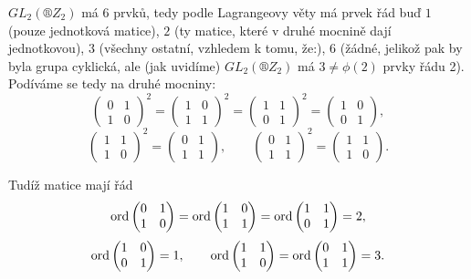 \documentclass[12pt]{article}                   %
\begin{document}
\begin{priklad}[5.2]
\begin{reseni}
            $GL_2(®Z_2)$ má 6 prvků, tedy podle Lagrangeovy věty má prvek řád buď $1$ (pouze jednotková matice), $2$ (ty matice, které v druhé mocnině dají jednotkovou), $3$ (všechny ostatní, vzhledem k tomu, že:), $6$ (žádné, jelikož pak by byla grupa cyklická, ale (jak uvidíme) $GL_2(®Z_2)$ má $3≠\phi(2)$ prvky řádu 2). Podíváme se tedy na druhé mocniny:
            $$  \begin{pmatrix} 0 & 1 \\ 1 & 0 \end{pmatrix}^2 = \begin{pmatrix} 1 & 0 \\ 1 & 1 \end{pmatrix}^2 = \begin{pmatrix} 1 & 1 \\ 0 & 1 \end{pmatrix}^2 = \begin{pmatrix} 1 & 0 \\ 0 & 1 \end{pmatrix}, $$
            $$ \begin{pmatrix} 1 & 1 \\ 1 & 0 \end{pmatrix}^2 = \begin{pmatrix} 0 & 1 \\ 1 & 1 \end{pmatrix}, \qquad \begin{pmatrix} 0 & 1 \\ 1 & 1 \end{pmatrix}^2 = \begin{pmatrix} 1 & 1 \\ 1 & 0 \end{pmatrix}. $$

            Tudíž matice mají řád
            $$  \operatorname{ord} \begin{pmatrix} 0 & 1 \\ 1 & 0 \end{pmatrix} = \operatorname{ord} \begin{pmatrix} 1 & 0 \\ 1 & 1 \end{pmatrix} = \operatorname{ord} \begin{pmatrix} 1 & 1 \\ 0 & 1 \end{pmatrix} = 2, $$
            $$ \operatorname{ord} \begin{pmatrix} 1 & 0 \\ 0 & 1 \end{pmatrix} = 1, \qquad \operatorname{ord} \begin{pmatrix} 1 & 1 \\ 1 & 0 \end{pmatrix} = \operatorname{ord} \begin{pmatrix} 0 & 1 \\ 1 & 1 \end{pmatrix} = 3. $$
        \end{reseni}
    \end{priklad}
\end{document}
